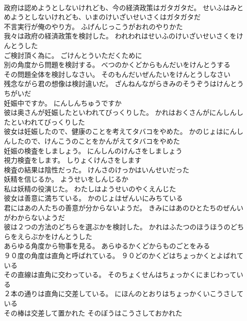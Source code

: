 \documentclass[8pt]{extreport}
\begin{document}
\begin{CJK}{UTF8}{min}
\\	政府は認めようとしないけれども、今の経済政策はガタガタだ。	せいふはみとめようとしないけれども、いまのけいざいせいさくはガタガタだ 
\\	不言実行が俺のやり方。	ふげんじっこうがおれのやりかた 
\\	我々は政府の経済政策を検討した。	われわれはせいふのけいざいせいさくをけんとうした 
\\	ご検討頂く為に。	ごけんとういただくために 
\\	別の角度から問題を検討する。	べつのかくどからもんだいをけんとうする 
\\	その問題全体を検討しなさい。	そのもんだいぜんたいをけんとうしなさい 
\\	残念ながら君の想像は検討違いだ。	ざんねんながらきみのそうぞうはけんとうちがいだ 
\\	妊娠中ですか。	にんしんちゅうですか 
\\	彼は奥さんが妊娠したといわれてびっくりした。	かれはおくさんがにんしんしたといわれてびっくりした 
\\	彼女は妊娠したので、健康のことを考えてタバコをやめた。	かのじょはにんしんしたので、けんこうのことをかんがえてタバコをやめた 
\\	妊娠の検査をしましょう。	にんしんのけんさをしましょう 
\\	視力検査をします。	しりょくけんさをします 
\\	検査の結果は陰性だった。	けんさのけっかはいんせいだった 
\\	妖精を信じるか。	ようせいをしんじるか 
\\	私は妖精の役演じた。	わたしはようせいのやくえんじた 
\\	彼女は善意に満ちている。	かのじょはぜんいにみちている 
\\	君にはあの人たちの善意が分からないようだ。	きみにはあのひとたちのぜんいがわからないようだ 
\\	彼は２つの方法のどちらを選ぶかを検討した。	かれはふたつのほうほうのどちらをえらぶかをけんとうした 
\\	あらゆる角度から物事を見る。	あらゆるかくどからものごとをみる 
\\	９０度の角度は直角と呼ばれている。	９０どのかくどはちょっかくとよばれている 
\\	その直線は直角に交わっている。	そのちょくせんはちょっかくにまじわっている 
\\	２本の通りは直角に交差している。	にほんのとおりはちょっかくいこうさしている 
\\	その棒は交差して置かれた	そのぼうはこうさしておかれた 

\end{CJK}
\end{document}
